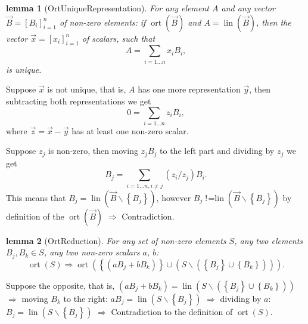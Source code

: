 \documentclass{mathcryptology} %
\DeclareMathOperator{\lin}{lin}
\DeclareMathOperator{\notlin}{!\!=lin}
\DeclareMathOperator{\ort}{ort}
\theoremstyle{title}
\newtheorem*{titlelemma}{lemma}
\theoremstyle{titleof}
\renewenvironment{proof}{\noindent{\bfseries Proof:} }{}
\begin{document}
    \begin{titlelemma}[OrtUniqueRepresentation]
        For any element $A$ and any vector $\vec{B}={\left[B_i\right]}_{i=1}^{n}$ of non-zero elements: if $\ort\left(\vec{B}\right)$ and $A=\lin\left(\vec{B}\right)$, then the vector $\vec{x}={\left[x_i\right]}_{i=1}^{n}$ of scalars, such that
        \begin{equation*}
            A=\sum_{i=1\dots{}n} x_iB_i,
        \end{equation*}
        is unique.
    \end{titlelemma}
    \begin{proof}
        Suppose $\vec{x}$ is not unique, that is, $A$ has one more representation $\vec{y}$, then subtracting both representations we get
        \begin{equation*}
            0=\sum_{i=1\dots{}n} z_iB_i,
        \end{equation*}
        where $\vec{z}=\vec{x}-\vec{y}$ has at least one non-zero scalar.

        Suppose $z_{j}$ is non-zero, then moving $z_{j}B_{j}$ to the left part and dividing by $z_{j}$ we get
        \begin{equation*}
            B_j = \sum_{i=1\dots{}n, i \neq j} \left(z_i/z_j\right)B_i.
        \end{equation*}
        This means that $B_{j}=\lin\left(\vec{B}{\backslash}\left\{ B_{j}\right\} \right)$, however $B_{j}\notlin\left(\vec{B}{\backslash}\left\{ B_{j}\right\} \right)$ by definition of the $\ort\left(\vec{B}\right)$ $\Rightarrow$ Contradiction.
    \end{proof}

    \begin{titlelemma}[OrtReduction]
        For any set of non-zero elements $S$, any two elements $B_{j}, B_{k}\in S$, any two non-zero scalars $a$, $b$:
        \begin{equation*}
            \ort\left(S\right) \Rightarrow \ort\left( \left\{ \left(aB_{j} + bB_{k}\right) \right\} \cup \left(S{\backslash}\left(\left\{ B_{j}\right\} \cup\left\{ B_{k}\right\}\right)\right)\right).
        \end{equation*}
    \end{titlelemma}
    \begin{proof}
        Suppose the opposite, that is, $\left(aB_{j}+bB_{k}\right)=\lin\left(S{\backslash}\left(\left\{B_{j}\right\}\cup \left\{B_{k}\right\}\right)\right)$ $\Rightarrow$ moving $B_{k}$ to the right: $aB_{j}=\lin\left(S{\backslash}\left\{ B_{j}\right\}\right)$ $\Rightarrow$ dividing by $a$: $B_{j}=\lin\left(S{\backslash}\left\{ B_{j}\right\}\right)$ $\Rightarrow$ Contradiction to the definition of $\ort\left(S\right)$.
    \end{proof}
\end{document}
